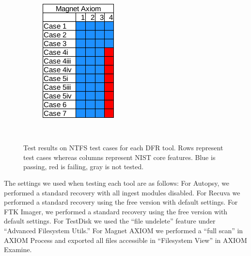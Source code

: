 \begin{figure}[h]
\begin{subfigure}{0.17\linewidth}
        \includegraphics[width=\linewidth]{fig/axiom_results_ntfs.png}
    \end{subfigure}~~
        
    \caption{Test results on NTFS test cases for each DFR tool. Rows represent test cases whereas columns represent NIST core features. Blue is passing, red is failing, gray is not tested.}
    \label{fig:results_ntfs}
\end{figure}

The settings we used when testing each tool are as follows:
For Autopsy, we performed a standard recovery with all ingest modules disabled.
For Recuva we performed a standard recovery using the free version with default settings.
For FTK Imager, we performed a standard recovery using the free version with default settings.
For TestDisk we used the ``file undelete'' feature under ``Advanced Filesystem Utils.''
For Magnet AXIOM we performed a ``full scan'' in AXIOM Process and exported all files accessible in ``Filesystem View'' in AXIOM Examine.



